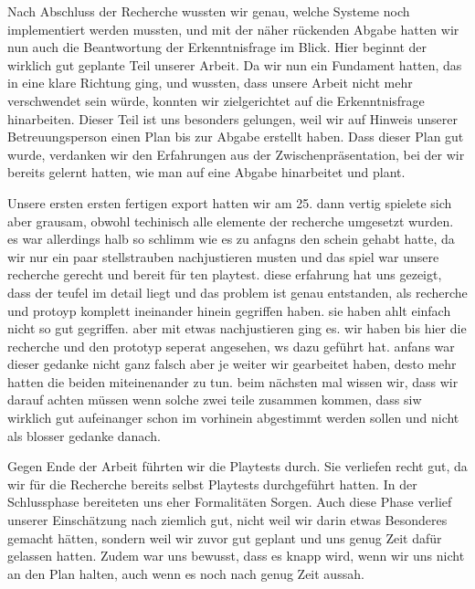 \documentclass[../Main.tex]{subfiles}
\begin{document}
Nach Abschluss der Recherche wussten wir genau, welche Systeme noch implementiert werden mussten, und mit der näher rückenden Abgabe hatten wir nun auch die Beantwortung der Erkenntnisfrage im Blick. Hier beginnt der wirklich gut geplante Teil unserer Arbeit. Da wir nun ein Fundament hatten, das in eine klare Richtung ging, und wussten, dass unsere Arbeit nicht mehr verschwendet sein würde, konnten wir zielgerichtet auf die Erkenntnisfrage hinarbeiten. Dieser Teil ist uns besonders gelungen, weil wir auf Hinweis unserer Betreuungsperson einen Plan bis zur Abgabe erstellt haben. Dass dieser Plan gut wurde, verdanken wir den Erfahrungen aus der Zwischenpräsentation, bei der wir bereits gelernt hatten, wie man auf eine Abgabe hinarbeitet und plant.

Unsere ersten ersten fertigen export hatten wir am 25. dann vertig spielete sich aber grausam, obwohl techinisch alle elemente der recherche umgesetzt wurden. es war allerdings halb so schlimm wie es zu anfagns den schein gehabt hatte, da wir nur ein paar stellstrauben nachjustieren musten und das spiel war unsere recherche gerecht und bereit für ten playtest. diese erfahrung hat uns gezeigt, dass der teufel im detail liegt und das problem ist genau entstanden, als recherche und protoyp komplett ineinander hinein gegriffen haben. sie haben ahlt einfach nicht so gut gegriffen. aber mit etwas nachjustieren ging es. wir haben bis hier die recherche und den prototyp seperat angesehen, ws dazu geführt hat. anfans war dieser gedanke nicht ganz falsch aber je weiter wir gearbeitet haben, desto mehr hatten die beiden miteinenander zu tun. beim nächsten mal wissen wir, dass wir darauf achten müssen wenn solche zwei teile zusammen kommen, dass siw wirklich gut aufeinanger schon im vorhinein abgestimmt werden sollen und nicht als blosser gedanke danach.

Gegen Ende der Arbeit führten wir die Playtests durch. Sie verliefen recht gut, da wir für die Recherche bereits selbst Playtests durchgeführt hatten. In der Schlussphase bereiteten uns eher Formalitäten Sorgen. Auch diese Phase verlief unserer Einschätzung nach ziemlich gut, nicht weil wir darin etwas Besonderes gemacht hätten, sondern weil wir zuvor gut geplant und uns genug Zeit dafür gelassen hatten. Zudem war uns bewusst, dass es knapp wird, wenn wir uns nicht an den Plan halten, auch wenn es noch nach genug Zeit aussah.
\end{document}
